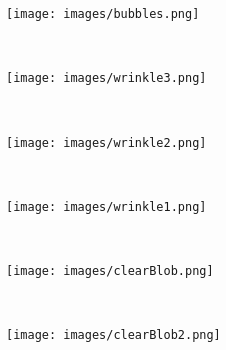 \documentclass[review,12pt,3p]{elsarticle}
\begin{document}
\begin{figure}
        \centering
        \begin{subfigure}[b]{0.08\textwidth}
                \texttt{[image: images/bubbles.png]}
                \caption{}
                \label{fig:gull}
        \end{subfigure}%
        ~ %
        \begin{subfigure}[b]{0.08\textwidth}
                \texttt{[image: images/wrinkle3.png]}
                \caption{}
        \end{subfigure}
        ~
        \begin{subfigure}[b]{0.08\textwidth}
                \texttt{[image: images/wrinkle2.png]}
                \caption{}
        \end{subfigure}
        ~
        \begin{subfigure}[b]{0.08\textwidth}
                \texttt{[image: images/wrinkle1.png]}
                \caption{}
        \end{subfigure}
        ~
        \begin{subfigure}[b]{0.08\textwidth}
                \texttt{[image: images/clearBlob.png]}
                \caption{}
        \end{subfigure}
        ~
        \begin{subfigure}[b]{0.08\textwidth}
                \texttt{[image: images/clearBlob2.png]}
                \caption{}
        \end{subfigure}
        

\end{figure}
\end{document}
